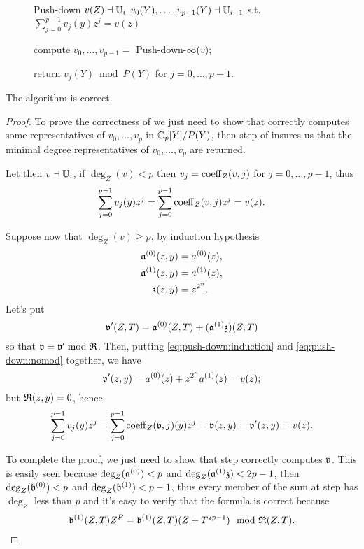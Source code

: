 \begin{figure}
  \begin{algorithm}
    {Push-down} {$v(Z)\dashv\mathbb{U}_i$} {$v_0(Y),\ldots,v_{p-1}(Y)\dashv\mathbb{U}_{i-1}$
      s.t. $\sum_{j=0}^{p-1}v_j(y) z^j = v(z)$}
  \item compute $v_0,\ldots,v_{p-1} = $ Push-down-$\infty$($v$);
  \item \label{alg:push-down:reduction} return $v_j(Y) \bmod P(Y)$ for
    $j = 0,\ldots,p-1$.
  \end{algorithm}
\end{figure}

\begin{theorem}
  The algorithm  is correct.
\end{theorem}
\begin{proof}
  To prove the correctness of  we just need to show
  that  correctly computes some
  representatives of $v_0,\ldots,v_p$ in $\mathbb{C}_p[Y]/P(Y)$, then step
   of  insures us that
  the minimal degree representatives of $v_0,\ldots,v_p$ are returned.

  Let then $v\dashv\mathbb{U}_i$, if $\deg_Z(v) < p$ then $v_j = \operatorname{coeff}_Z(v,j)$
  for $j = 0,\ldots,p-1$, thus
  \[\sum_{j=0}^{p-1}v_j(y)z^j = \sum_{j=0}^{p-1}\operatorname{coeff}_Z(v,j)z^j = v(z)
  \text{.}\]
  
  Suppose now that $\deg_Z(v) \ge p$, by induction hypothesis
  \begin{equation}
    \label{eq:push-down:induction}
    \begin{aligned}
      \mathfrak{a}^{(0)}(z, y) &= a^{(0)}(z) \text{,}\\
      \mathfrak{a}^{(1)}(z, y) &= a^{(1)}(z) \text{,}\\
      \mathfrak{z}(z, y)      &= z^{2^n} \text{.}
    \end{aligned}
  \end{equation}
  Let's put 
  \begin{equation}
    \label{eq:push-down:nomod}
    \mathfrak{v}'(Z,T) = \mathfrak{a}^{(0)}(Z,T) + (\mathfrak{a}^{(1)}\mathfrak{z})(Z,T)
  \end{equation}
  so that $\mathfrak{v} = \mathfrak{v}' \bmod \mathfrak{R}$. Then, putting
  \eqref{eq:push-down:induction} and \eqref{eq:push-down:nomod}
  together, we have
  \[\mathfrak{v}'(z,y) = a^{(0)}(z) + z^{2^n}a^{(1)}(z) = v(z) \text{;}\]
  but $\mathfrak{R}(z,y) = 0$, hence 
  \[\sum_{j=0}^{p-1}v_j(y)z^j = \sum_{j=0}^{p-1}\operatorname{coeff}_Z(\mathfrak{v},j)(y)z^j =
  \mathfrak{v}(z,y) = \mathfrak{v}'(z,y) = v(z) \text{.}\]

  To complete the proof, we just need to show that step
   correctly computes $\mathfrak{v}$. This is
  easily seen because $\deg_Z(\mathfrak{a}^{(0)}) < p$ and
  $\deg_Z(\mathfrak{a}^{(1)}\mathfrak{z}) < 2p-1$, then $\deg_Z(\mathfrak{b}^{(0)}) <
  p$ and $\deg_Z(\mathfrak{b}^{(1)}) < p-1$, thus every member of the sum
  at step  has $\deg_Z$ less than $p$ and
  it's easy to verify that the formula is correct because
  \[\biv{b}^{(1)}(Z,T)Z^P = \biv{b}^{(1)}(Z,T)(Z + T^{2p-1}) \mod \biv{R}(Z,T) 
  \text{.}\]
\end{proof}

